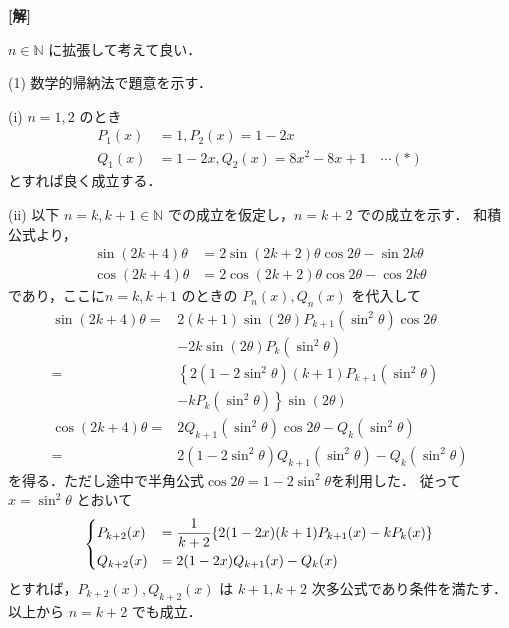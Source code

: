 \documentclass[a4paper,10pt]{ltjsarticle}
\begin{document}
\begin{multicols}{2}
{\bf[解]}

$n \in \mathbb{N}$ に拡張して考えて良い．

(1) 数学的帰納法で題意を示す．

\vspace{10pt}

(i)
$n=1, 2$ のとき
\begin{align*}
    P_1(x) &= 1, P_2(x) = 1-2x \\
    Q_1(x) &= 1-2x, Q_2(x) = 8x^2 - 8x + 1 \quad \cdots (*)
\end{align*}
とすれば良く成立する．

\vspace{10pt}

(ii)
以下 $n=k, k+1 \in \mathbb{N}$ での成立を仮定し，$n=k+2$ での成立を示す．
和積公式より，
\begin{align*}
    \sin(2k+4)\theta 
    &= 2\sin(2k+2)\theta\cos2\theta - \sin2k\theta \\
    \cos(2k+4)\theta 
    &= 2\cos(2k+2)\theta\cos2\theta - \cos2k\theta 
\end{align*}
であり，ここに$n=k, k+1$ のときの $P_n(x), Q_n(x)$ を代入して
\begin{align*}
    \sin(2k+4)\theta 
    =& 2 (k+1) \sin(2\theta) P_{k+1}(\sin^2\theta) \cos 2\theta \\
     &- 2 k \sin(2\theta) P_k(\sin^2\theta) \\
    =& \left\{2(1-2\sin^2\theta)(k+1)P_{k+1}(\sin^2\theta) \right. \\
     & \left. - kP_k(\sin^2\theta)\right\}\sin(2\theta) \\
    \cos(2k+4)\theta
    =& 2Q_{k+1}(\sin^2\theta)\cos2\theta - Q_{k}(\sin^2\theta) \\
    =& 2(1-2\sin^2\theta)Q_{k+1}(\sin^2\theta) - Q_k(\sin^2\theta)
\end{align*}
を得る．ただし途中で半角公式$\cos2\theta = 1-2\sin^2\theta$を利用した．
従って$x=\sin^2\theta$ とおいて
\begin{align}\label{eq:condition}
    \begin{dcases}
        P_{k+2}(x) &= \frac{1}{k+2}\{2(1-2x)(k+1)P_{k+1}(x) - kP_k(x)\} \\
        Q_{k+2}(x) &= 2(1-2x)Q_{k+1}(x) - Q_k(x)
    \end{dcases}
\end{align}
とすれば，$P_{k+2}(x), Q_{k+2}(x)$ は $k+1, k+2$ 次多公式であり条件を満たす．以上から $n=k+2$ でも成立．


\end{multicols}
\end{document}
